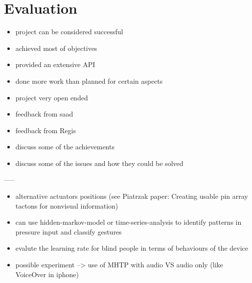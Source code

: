 \chapter{Evaluation}

\begin{itemize}
	\item project can be considered successful
    \item achieved most of objectives
    \item provided an extensive API
    \item done more work than planned for certain aspects
    \item project very open ended
    \item feedback from saad
    \item feedback from Regis
    \item discuss some of the achievements
    \item discuss some of the issues and how they could be solved
\end{itemize}


-----

\begin{itemize}
    \item alternative actuators positions (see Piatrzak paper: Creating usable pin array tactons for nonvisual information)
    \item can use hidden-markov-model or time-series-analysis to identify patterns in pressure input and classify gestures
    \item evalute the learning rate for blind people in terms of behaviours of the device
    \item possible experiment --> use of MHTP with audio VS audio only (like VoiceOver in iphone)
\end{itemize}